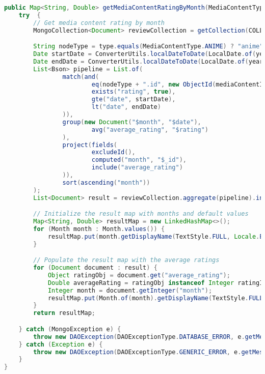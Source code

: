 \begin{mdframed}[style=customstyle]
\begin{lstlisting}[language=java]
public Map<String, Double> getMediaContentRatingByMonth(MediaContentType type, String mediaContentId, int year) throws DAOException {
    try  {
        // Get media content rating by month
        MongoCollection<Document> reviewCollection = getCollection(COLLECTION_NAME);

        String nodeType = type.equals(MediaContentType.ANIME) ? "anime" : "manga";
        Date startDate = ConverterUtils.localDateToDate(LocalDate.of(year, 1, 1));
        Date endDate = ConverterUtils.localDateToDate(LocalDate.of(year + 1, 1, 1));
        List<Bson> pipeline = List.of(
                match(and(
                        eq(nodeType + ".id", new ObjectId(mediaContentId)),
                        exists("rating", true),
                        gte("date", startDate),
                        lt("date", endDate)
                )),
                group(new Document("$month", "$date"),
                        avg("average_rating", "$rating")
                ),
                project(fields(
                        excludeId(),
                        computed("month", "$_id"),
                        include("average_rating")
                )),
                sort(ascending("month"))
        );
        List<Document> result = reviewCollection.aggregate(pipeline).into(new ArrayList<>());

        // Initialize the result map with months and default values
        Map<String, Double> resultMap = new LinkedHashMap<>();
        for (Month month : Month.values()) {
            resultMap.put(month.getDisplayName(TextStyle.FULL, Locale.ENGLISH), null);
        }

        // Populate the result map with the average ratings
        for (Document document : result) {
            Object ratingObj = document.get("average_rating");
            Double averageRating = ratingObj instanceof Integer ratingInt ? ratingInt.doubleValue() : (Double) ratingObj;
            Integer month = document.getInteger("month");
            resultMap.put(Month.of(month).getDisplayName(TextStyle.FULL, Locale.ENGLISH), averageRating);
        }
        return resultMap;

    } catch (MongoException e) {
        throw new DAOException(DAOExceptionType.DATABASE_ERROR, e.getMessage());
    } catch (Exception e) {
        throw new DAOException(DAOExceptionType.GENERIC_ERROR, e.getMessage());
    }
}\end{lstlisting}
\end{mdframed}

